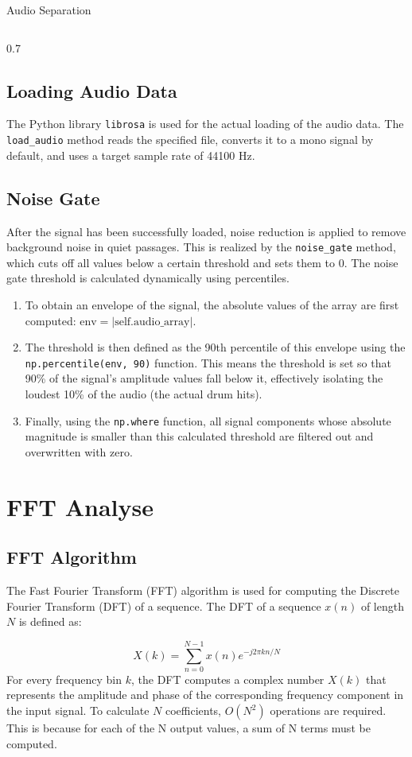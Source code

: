 \documentclass[aspectratio=169]{beamer}
\begin{document}
\begin{frame}{Audio Separation}
\begin{columns}[T]
\begin{column}{0.7\textwidth}
\subsection{Loading Audio Data}
The Python library \texttt{librosa} is used for the actual loading of the audio data. The \texttt{load\_audio}\cite{librosa} method reads the specified file, converts it to a mono signal by default, and uses a target sample rate of 44100 Hz. 

\subsection{Noise Gate}
After the signal has been successfully loaded, noise reduction is applied to remove background noise in quiet passages. This is realized by the \texttt{noise\_gate} method, which cuts off all values below a certain threshold and sets them to 0. The noise gate threshold is calculated dynamically using percentiles.
\begin{enumerate}
    \item To obtain an envelope of the signal, the absolute values of the array are first computed: $\text{env} = |\text{self.audio\_array}|$.
    \item The threshold is then defined as the 90th percentile of this envelope using the \texttt{np.percentile(env, 90)} function\cite{numpy}. This means the threshold is set so that 90\% of the signal's amplitude values fall below it, effectively isolating the loudest 10\% of the audio (the actual drum hits).
    \item Finally, using the \texttt{np.where} function\cite{numpy}, all signal components whose absolute magnitude is smaller than this calculated threshold are filtered out and overwritten with zero. 
\end{enumerate}

\section{FFT Analyse}
    \subsection{FFT Algorithm}
        The Fast Fourier Transform (FFT) algorithm is used for computing the Discrete Fourier Transform (DFT) of a sequence. 
        The DFT of a sequence $x(n)$ of length $N$ is defined as:

        \begin{equation}
            X(k) = \sum_{n=0}^{N-1} x(n) e^{-j2\pi kn/N}
        \end{equation}
        For every frequency bin $k$, the DFT computes a complex number $X(k)$ that represents the amplitude and phase of the corresponding frequency component in the input signal.
        To calculate $N$ coefficients, $O(N^2)$ operations are required. This is because for each of the N output values, a sum of N terms must be computed. 


\end{column}
\end{columns}
\end{frame}
\end{document}
